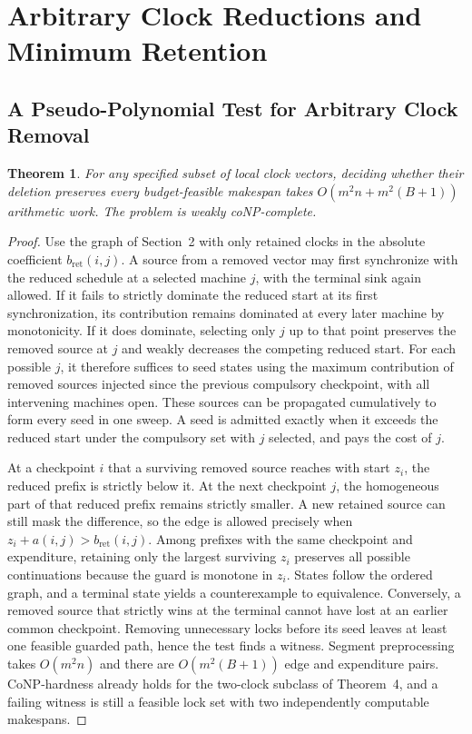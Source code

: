 \documentclass[11pt,letterpaper]{article}
\newtheorem{theorem}{Theorem}
\begin{document}
\section{Arbitrary Clock Reductions and Minimum Retention}
\label{app:deletion}

\subsection{A Pseudo-Polynomial Test for Arbitrary Clock Removal}

\begin{theorem}
\label{thm:arb_deletion}
For any specified subset of local clock vectors, deciding whether their deletion preserves every budget-feasible makespan takes $O(m^2n+m^2(B+1))$ arithmetic work. The problem is weakly coNP-complete.
\end{theorem}

\begin{proof}
Use the graph of Section~2 with only retained clocks in the absolute coefficient $b_{\mathrm{ret}}(i,j)$. A source from a removed vector may first synchronize with the reduced schedule at a selected machine $j$, with the terminal sink again allowed. If it fails to strictly dominate the reduced start at its first synchronization, its contribution remains dominated at every later machine by monotonicity. If it does dominate, selecting only $j$ up to that point preserves the removed source at $j$ and weakly decreases the competing reduced start. For each possible $j$, it therefore suffices to seed states using the maximum contribution of removed sources injected since the previous compulsory checkpoint, with all intervening machines open. These sources can be propagated cumulatively to form every seed in one sweep. A seed is admitted exactly when it exceeds the reduced start under the compulsory set with $j$ selected, and pays the cost of $j$.

At a checkpoint $i$ that a surviving removed source reaches with start $z_i$, the reduced prefix is strictly below it. At the next checkpoint $j$, the homogeneous part of that reduced prefix remains strictly smaller. A new retained source can still mask the difference, so the edge is allowed precisely when $z_i+a(i,j)>b_{\mathrm{ret}}(i,j)$. Among prefixes with the same checkpoint and expenditure, retaining only the largest surviving $z_i$ preserves all possible continuations because the guard is monotone in $z_i$. States follow the ordered graph, and a terminal state yields a counterexample to equivalence. Conversely, a removed source that strictly wins at the terminal cannot have lost at an earlier common checkpoint. Removing unnecessary locks before its seed leaves at least one feasible guarded path, hence the test finds a witness. Segment preprocessing takes $O(m^2n)$ and there are $O(m^2(B+1))$ edge and expenditure pairs. CoNP-hardness already holds for the two-clock subclass of Theorem~4, and a failing witness is still a feasible lock set with two independently computable makespans.
\end{proof}
\end{document}
